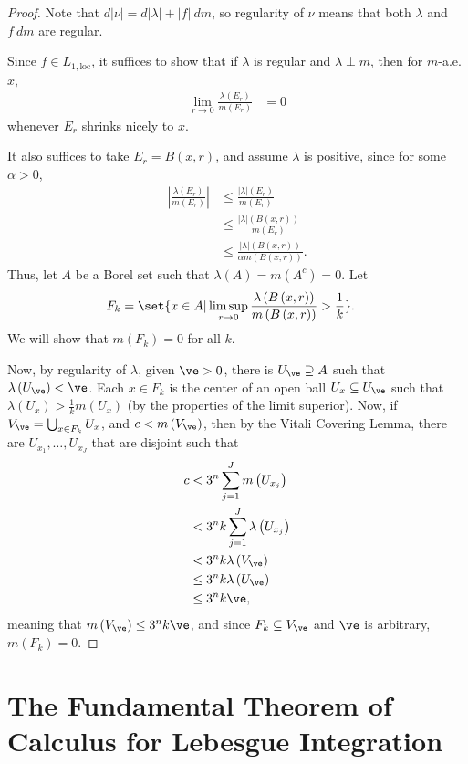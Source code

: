 \documentclass[10pt]{mypackage}
\begin{document}
 \begin{proof}
   Note that $d\left\vert \nu \right\vert = d\left\vert \lambda \right\vert + \left\vert f \right\vert\:dm$, so regularity of $\nu$ means that both $\lambda$ and $f\:dm$ are regular.\newline

   Since $f\in L_{1,\text{loc}}$, it suffices to show that if $\lambda$ is regular and $\lambda \perp m$, then for $m$-a.e. $x$,
   \begin{align*}
     \lim_{r\rightarrow 0} \frac{\lambda\left( E_r \right)}{m\left( E_r \right)} &= 0
   \end{align*}
   whenever $E_r$ shrinks nicely to $x$.\newline

   It also suffices to take $E_r = B\left( x,r \right)$, and assume $\lambda$ is positive, since for some $\alpha > 0$,
   \begin{align*}
     \left\vert \frac{\lambda\left( E_r \right)}{m\left( E_r \right)}  \right\vert &\leq \frac{\left\vert \lambda \right\vert\left( E_r \right)}{m\left( E_r \right)}\\
                                                                                   &\leq \frac{\left\vert \lambda \right\vert\left( B\left( x,r \right) \right)}{m\left( E_r \right)}\\
                                                                                   &\leq \frac{\left\vert \lambda \right\vert\left( B\left( x,r \right) \right)}{\alpha m\left( B\left( x,r \right) \right)}.
   \end{align*}
   Thus, let $A$ be a Borel set such that $\lambda\left( A \right) = m\left( A^{c} \right) = 0$. Let
   \begin{align*}
     F_k &= \set{x\in A | \limsup_{r\rightarrow 0} \frac{\lambda\left( B\left( x,r \right) \right)}{m\left( B\left( x,r \right) \right)} > \frac{1}{k}}.
   \end{align*}
   We will show that $m\left( F_k \right) = 0$ for all $k$.\newline

   Now, by regularity of $\lambda$, given $\ve > 0$, there is $U_{\ve} \supseteq A$ such that $\lambda\left( U_{\ve} \right) < \ve$. Each $x\in F_k$ is the center of an open ball $U_{x}\subseteq U_{\ve}$ such that $\lambda\left( U_x \right) > \frac{1}{k}m\left( U_{x} \right)$ (by the properties of the limit superior). Now, if $V_{\ve} = \bigcup_{x\in F_k} U_x$, and $c < m\left( V_{\ve} \right)$, then by the Vitali Covering Lemma, there are $U_{x_1},\dots,U_{x_J}$ that are disjoint such that
   \begin{align*}
     c &< 3^{n}\sum_{j=1}^{J} m\left( U_{x_j} \right)\\
       &< 3^{n}k\sum_{j=1}^{J} \lambda\left( U_{x_j} \right)\\
       &< 3^{n}k\lambda\left( V_{\ve} \right)\\
       &\leq 3^{n}k\lambda\left( U_{\ve} \right)\\
       &\leq 3^{n}k\ve,
   \end{align*}
   meaning that $m\left( V_{\ve} \right) \leq 3^{n}k\ve$, and since $F_k\subseteq V_{\ve}$ and $\ve$ is arbitrary, $m\left( F_k \right) = 0$.
 \end{proof}
\section{The Fundamental Theorem of Calculus for Lebesgue Integration}%
\end{document}
